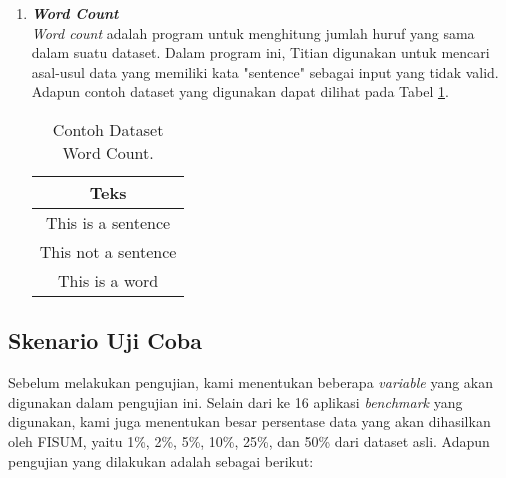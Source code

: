 \begin{enumerate}
      \ 

      \item \emph{\textbf{Word Count}} \\
            \emph{Word count} adalah program untuk menghitung jumlah huruf yang sama dalam suatu dataset. Dalam program ini, Titian digunakan untuk mencari asal-usul data yang memiliki kata "sentence" sebagai input yang tidak valid.
            Adapun contoh dataset yang digunakan dapat 
            dilihat pada Tabel \ref{tb:wordcountdataset}.

            \begin{longtable}{|c|}
                  \caption{Contoh Dataset Word Count.}
                  \label{tb:wordcountdataset} \\
                  \hline
                  \rowcolor[HTML]{C0C0C0}
                  \textbf{Teks} \\
                  \hline
                  This is a sentence \\
                  This not a sentence \\
                  This is a word \\
                  \hline
            \end{longtable}

\end{enumerate}


\subsection{Skenario Uji Coba}
\label{subsec:skenarioujicoba}

Sebelum melakukan pengujian, kami menentukan beberapa 
\emph{variable} yang akan digunakan dalam pengujian ini.
Selain dari ke 16 aplikasi \emph{benchmark} yang digunakan,
kami juga menentukan besar persentase data yang akan
dihasilkan oleh FISUM, yaitu 1\%, 2\%, 5\%, 10\%, 25\%, dan
50\% dari dataset asli. Adapun pengujian yang dilakukan
adalah sebagai berikut:

